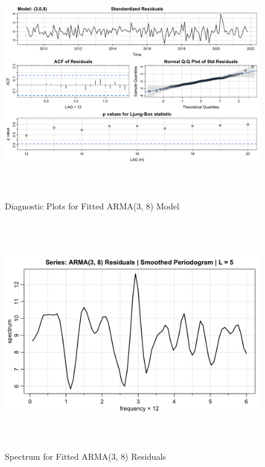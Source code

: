 \documentclass[10pt]{article}
\begin{document}
\begin{figure}[ht!]
    \centering
    \includegraphics[height=100mm, width=125mm]{diagnostics.png}
    \caption{Diagnostic Plots for Fitted ARMA(3, 8) Model}
\end{figure}

\begin{figure}[ht!]
    \centering
    \includegraphics[height=100mm, width=125mm]{arma_res_spec.png}
    \caption{Spectrum for Fitted ARMA(3, 8) Residuals}
\end{figure}
\end{document}

